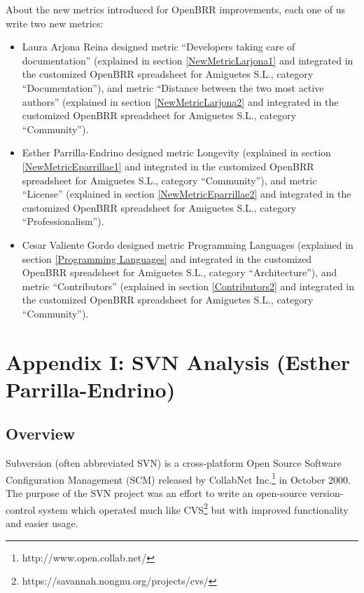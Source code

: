 \documentclass[a4paper,10pt]{article}
\begin{document}
About the new metrics introduced for OpenBRR improvements, each one of us write
two new metrics:
\begin{itemize}
\item Laura Arjona Reina designed metric ``Developers taking care of
documentation'' (explained in section \ref{NewMetricLarjona1} and integrated in
the customized OpenBRR spreadsheet for Amiguetes S.L., category
``Documentation''\cite{OpenBRR_amiguetes}), and metric ``Distance between the
two most active authors'' (explained in section \ref{NewMetricLarjona2} and
integrated in the customized OpenBRR spreadsheet for Amiguetes S.L., category
``Community''\cite{OpenBRR_amiguetes}).

\item Esther Parrilla-Endrino designed metric Longevity (explained in section
\ref{NewMetricEparrillae1} and integrated in
the customized OpenBRR spreadsheet for Amiguetes S.L., category
``Community''\cite{OpenBRR_amiguetes}), and metric ``License'' (explained in section
\ref{NewMetricEparrillae2} and
integrated in the customized OpenBRR spreadsheet for Amiguetes S.L., category
``Professionalism''\cite{OpenBRR_amiguetes}).
\item Cesar Valiente Gordo designed metric Programming Languages (explained in section
\ref{Programming Languages} and integrated in
the customized OpenBRR spreadsheet for Amiguetes S.L., category
``Architecture''\cite{OpenBRR_amiguetes}), and metric ``Contributors'' (explained in section
\ref{Contributors2} and
integrated in the customized OpenBRR spreadsheet for Amiguetes S.L., category
``Community''\cite{OpenBRR_amiguetes}).
\end{itemize}

\newpage

\section{Appendix I: SVN Analysis (Esther Parrilla-Endrino)} \label{SVN
Appendix}

\subsection{Overview}
Subversion\cite{Subversion (Wikipedia)} (often abbreviated SVN) is a
cross-platform Open Source Software Configuration Management (SCM) released by
CollabNet Inc.\footnote{http://www.open.collab.net/} in October 2000. The
purpose of the SVN project was an effort to write an open-source version-control
system which operated much like
CVS\footnote{https://savannah.nongnu.org/projects/cvs/} but with improved
functionality and easier usage. 
\end{document}
